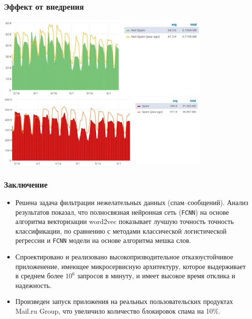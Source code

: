 \documentclass[compress,professionalfont]{beamer}
\begin{document}
\begin{frame}
\frametitle{Эффект от внедрения}

\begin{center}
\includegraphics[width=0.8\textwidth]{is_not_spam_yeas_2_yeas.jpg}
\includegraphics[width=0.8\textwidth]{is_spam_yeas_2_yeas.jpg}
\end{center}

\end{frame}

\begin{frame}[fragile=singleslide]
\frametitle{Заключение}

\begin{itemize}
\item Решена задача фильтрации нежелательных данных (спам--сообщений). Анализ результатов показал, что полносвязная нейронная сеть (\verb|FCNN|) на основе алгоритма векторизации word2vec показывает лучшую точность точность классификации, по сравнению с методами классической логистической регрессии и \verb|FCNN| модели на основе алгоритма мешка слов.

\item Спроектировано и реализовано высокопризводительное отказоустойчивое приложенение, имеющее микросервисную архитектуру, которое выдерживает в среднем более $10^6$ запросов в минуту, и имеет высокое время отклика и надежность.

\item Произведен запуск приложения на реальных пользовательских продуктах Mail.ru Group, что увеличило количество блокировок спама на 10\%.
\end{itemize}

\end{frame}
\end{document}
